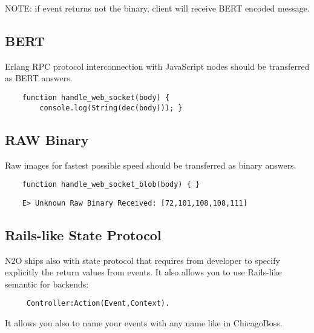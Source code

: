 NOTE: if event returns not the binary, client will receive BERT encoded message.

\subsection*{BERT}

Erlang RPC protocol interconnection with JavaScript nodes should be transferred as BERT answers.

\begin{lstlisting}
    function handle_web_socket(body) {
        console.log(String(dec(body))); }
\end{lstlisting}

\subsection*{RAW Binary}

Raw images for fastest possible speed should be transferred as binary answers.

\begin{lstlisting}
    function handle_web_socket_blob(body) { }
\end{lstlisting}

\begin{lstlisting}
    E> Unknown Raw Binary Received: [72,101,108,108,111]
\end{lstlisting}

\subsection*{Rails-like State Protocol}

N2O ships also with state protocol that requires from developer
to specify explicitly the return values from events. It also allows you
to use Rails-like semantic for backends:

\begin{lstlisting}
     Controller:Action(Event,Context).
\end{lstlisting}

It allows you also to name your events with any name like in ChicagoBoss.

